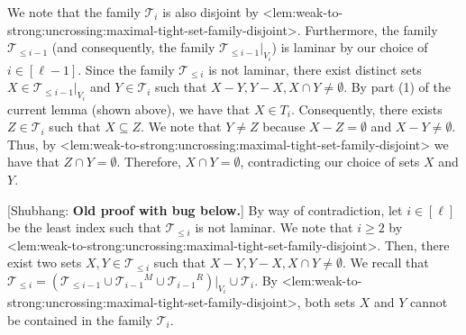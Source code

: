 \documentclass{article}
\def\Cref#1{<#1>}%
\newcommand{\maximalTightSetFamily}[1]{\ensuremath{\calT_{#1}}\xspace}
\newcommand{\tightSetFamily}[1]{\ensuremath{T_{#1}}\xspace}
\newcommand{\cumulativeMaximalTightSetFamily}[1]{\ensuremath{\calT_{\leq #1}}}
\newcommand{\projCumulativeMaximalTightSetFamily}[2]{\ensuremath{\calT_{\leq #1}|_{V_{#2}}}}
\newcommand{\shubhang}[1]{{\color{blue}[{\tiny Shubhang: \bf #1}]\marginpar{\color{blue}*}}}
\providecommand{\calT}{\mathcal{T}}
\begin{document}
        We note that the family $\maximalTightSetFamily{i}$ is also disjoint by \Cref{lem:weak-to-strong:uncrossing:maximal-tight-set-family-disjoint}. Furthermore, the family $\cumulativeMaximalTightSetFamily{i-1}$ (and consequently, the family  $\cumulativeMaximalTightSetFamily{i-1}|_{V_i}$) is laminar by our choice of $i\in[\ell - 1]$. Since the family $\cumulativeMaximalTightSetFamily{i}$ is not laminar, there exist distinct sets $X \in \projCumulativeMaximalTightSetFamily{i-1}{i}$ and $Y \in \maximalTightSetFamily{i}$ such that $X - Y, Y - X, X \cap Y \not = \emptyset$. By part (1) of the current lemma (shown above), we have that $X \in \tightSetFamily{i}$. Consequently, there exists $Z\in \maximalTightSetFamily{i}$ such that $X \subseteq Z$. We note that $Y \not = Z$ because $X -Z=\emptyset$ and $X - Y \not = \emptyset$. Thus, by \Cref{lem:weak-to-strong:uncrossing:maximal-tight-set-family-disjoint} we have that $Z\cap Y = \emptyset$. Therefore, $X\cap Y = \emptyset$, contradicting our choice of sets $X$ and $Y$.

        \iffalse
        \shubhang{Old proof with bug below.} By way of contradiction, let $i \in [\ell]$ be the least index such that $\cumulativeMaximalTightSetFamily{i}$ is not laminar. We note that $i \geq 2$ by \Cref{lem:weak-to-strong:uncrossing:maximal-tight-set-family-disjoint}. Then, there exist two sets $X, Y \in \cumulativeMaximalTightSetFamily{i}$ such that $X- Y, Y - X, X\cap Y \not = \emptyset$. We recall that $\cumulativeMaximalTightSetFamily{i} = \left(\cumulativeMaximalTightSetFamily{i-1} \cup \maximalTightSetFamily{i-1}^M \cup \maximalTightSetFamily{i-1}^R\right)|_{V_i}\cup \maximalTightSetFamily{i}$. By \Cref{lem:weak-to-strong:uncrossing:maximal-tight-set-family-disjoint}, both sets $X$ and $Y$ cannot be contained in the family $\maximalTightSetFamily{i}$. 
\end{document}
